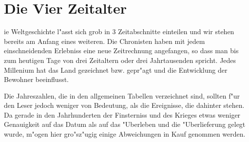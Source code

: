 \section{Die Vier Zeitalter}

ie Weltgeschichte l"asst sich grob in 3 Zeitabschnitte einteilen und wir stehen bereits am Anfang eines weiteren. Die Chronisten haben mit jedem einschneidenden Erlebniss eine neue Zeitrechnung angefangen, so dass man bis zum heutigen Tage von drei Zeitaltern oder drei Jahrtausenden spricht. Jedes Millenium hat das Land gezeichnet bzw. gepr"agt und die Entwicklung der Bewohner beeinflusst.
\par Die Jahreszahlen, die in den allgemeinen Tabellen verzeichnet sind, sollten f"ur den Leser jedoch weniger von Bedeutung, als die Ereignisse, die dahinter stehen. Da gerade in den Jahrhunderten der Finsterniss und des Krieges etwas weniger Genauigkeit auf das Datum als auf das "Uberleben und die "Uberlieferung gelegt wurde, m"ogen hier gro"sz"ugig einige Abweichungen in Kauf genommen werden.
